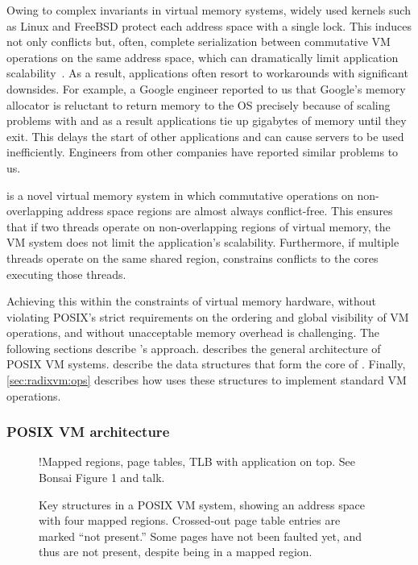 Owing to complex invariants in virtual memory systems,
widely used kernels such as Linux and FreeBSD protect each address
space with a single lock.  This induces not only conflicts but, often,
complete serialization between commutative VM operations on the same
address space, which can dramatically limit application
scalability~\cite{boyd-wickizer:scaling,clements:bonsai}.
%
As a result, applications often resort to workarounds with significant
downsides.
%
For example, a Google engineer reported to us that Google's memory
allocator is reluctant to return memory to the OS precisely because of
scaling problems with  and as a result applications tie
up gigabytes of memory until they exit.
%
This delays the start of other applications and can cause servers to
be used inefficiently.
%
Engineers from other companies have reported similar problems to us.

\vm is a novel virtual memory system in which commutative operations
on non-overlapping address space regions are almost always
conflict-free.  This ensures that if two threads operate on
non-overlapping
regions of virtual memory, the VM system does not limit the
application's scalability.  Furthermore, if multiple threads operate
on the same shared region, \vm constrains conflicts to the cores
executing those threads.

Achieving this within the constraints of virtual memory hardware,
without violating POSIX's strict requirements on the ordering and
global visibility of VM operations, and without unacceptable memory
overhead is challenging.  The following sections describe \vm's
approach.   describes the general architecture
of POSIX VM systems.   describe
the data structures that form the core of \vm.  Finally,
\cref{sec:radixvm:ops} describes how \vm uses these structures to
implement standard VM operations.

\subsubsection{POSIX VM architecture}
\label{sec:radixvm:arch}

\begin{figure}
  \centering
  \XXX!{Mapped regions, page tables, TLB with application on top.  See
    Bonsai Figure 1 and \vm talk.}
  \caption[Key structures in a POSIX VM system.]{Key structures in a
    POSIX VM system, showing an address space with four mapped
    regions.  Crossed-out page table entries are marked ``not
    present.''  Some pages have not been faulted yet, and thus are not
    present, despite being in a mapped region.}
  \label{fig:vm-structures}
\end{figure}

